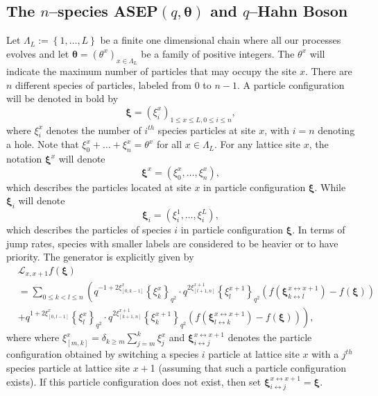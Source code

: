\documentclass{ximera}
\begin{document}
\subsection{The $n$--species ASEP$(q,\boldsymbol{\theta})$ and $q$--Hahn Boson} \label{sec2.4}
Let $\Lambda_L := \left \{ 1, \ldots, L \right \} $ be a finite one dimensional chain where all our processes evolves and let $\boldsymbol{\theta}=(\theta^x)_{ x \in \Lambda_L}$ be a family of positive integers. The $\theta^x$ will indicate the maximum number of particles that may occupy the site $x$. There are $n$ different species of particles, labeled from $0$ to $n-1$. A particle configuration will be denoted in bold by
$$
\boldsymbol{\xi} = (\xi^x_{i})_{1 \leq x \leq L,0\leq i \leq n},
$$
where $\xi^x_{i}$ denotes the number of $i^{th}$ species particles at site $x$, with $i=n$ denoting a hole. Note that $\xi^x_{0} + \ldots + \xi^x_{n} = \theta^x$ for all $x\in \Lambda_L$.
For any lattice site $x$, the notation $\boldsymbol\xi^x$ will denote
$$
\boldsymbol\xi^x = (\xi^x_0, \ldots,\xi^x_n),
$$
which describes the particles located at site $x$ in particle configuration $\boldsymbol{\xi}$.
While $\boldsymbol\xi_i$ will denote
$$
\boldsymbol\xi_i = (\xi^1_i, \ldots,\xi^L_i),
$$
which describes the particles of species $i$  in particle configuration $\boldsymbol{\xi}$.
In terms of jump rates, species with smaller labels are considered to be heavier or to have priority. The generator is explicitly given by 
\begin{align*}
 & \mathcal{L}_{x, x+1} f(\boldsymbol\xi)  \\ & = \sum_{0 \leq k<l \leq n}\left( q^{-1+2\xi^x_{[0,k-1]}}\left\{\xi_{k}^{x}\right\}_{q^{2}} \cdot q^{2\xi_{[l+1,n]}^{x+1}}\left\{\xi_{l}^{x+1}\right\}_{q^{2}}\left(f\left(\boldsymbol\xi_{k \leftrightarrow l}^{x \leftrightarrow x+1}\right)-f(\boldsymbol\xi)\right)\right.\\ &\left.+ q^{1+2\xi_{[0,l-1]}^{x}}\left\{\xi_{l}^{x}\right\}_{q^{2}} \cdot q^{2\xi_{[k+1,n]}^{x+1}}\left\{\xi_{k}^{x+1}\right\}_{q^{2}}\left(f\left(\boldsymbol\xi_{l \leftrightarrow k}^{x \leftrightarrow x+1}\right)-f(\boldsymbol\xi)\right)\right), 
\end{align*}
where where $\xi_{[m, k]}^{x}=\delta_{k\ge m}\sum_{j=m}^k\xi_j^x$ and 
 $\boldsymbol\xi^{x\leftrightarrow x+1}_{i \leftrightarrow j}$ denotes the particle configuration
obtained by switching a species $i$ particle at lattice site $x$ with a $j^{th}$ species particle
at lattice site $x +$1 (assuming that such a particle configuration exists). If this particle configuration does not exist, then set $\boldsymbol\xi^{x\leftrightarrow x +1}_{i \leftrightarrow j} = \boldsymbol\xi$.
\end{document}
